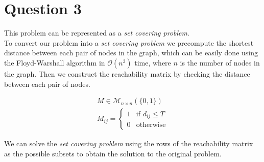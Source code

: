 \section{Question 3}

This problem can be represented as a \textit{set covering problem}.  \\

To convert our problem into a \textit{set covering problem} we precompute the shortest distance between each pair of nodes in the graph, which can be easily done using the Floyd-Warshall algorithm in $\mathcal{O}(n^3)$ time, where $n$ is the number of nodes in the graph.
Then we construct the reachability matrix by checking the distance between each pair of nodes.

\begin{align*}
	M \in \mathcal{M}_{n \times n} (\{0, 1\})  \\
	M_{ij} = \begin{cases}
		1 & \text{if } d_{ij} \leq T \\
		0 & \text{otherwise}
	\end{cases}
\end{align*}

We can solve the \textit{set covering problem} using the rows of the reachability matrix as the possible subsets to obtain the solution to the original problem.
